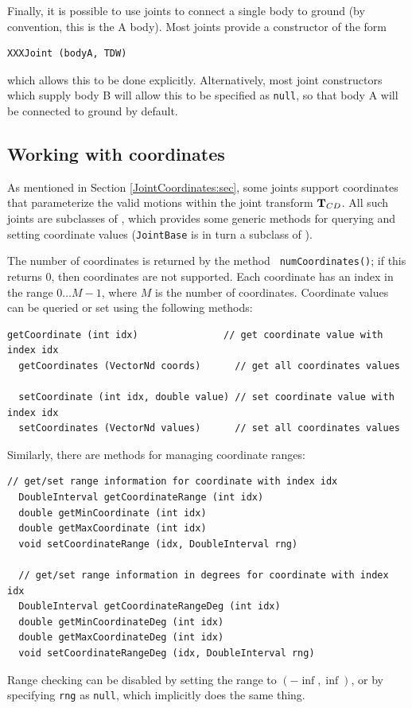 Finally, it is possible to use joints to connect a single body to
ground (by convention, this is the A body). Most joints provide a
constructor of the form
%
\begin{lstlisting}[]
  XXXJoint (bodyA, TDW)
\end{lstlisting}
%
which allows this to be done explicitly. Alternatively, most joint
constructors which supply body B will allow this to be specified as
{\tt null}, so that body A will be connected to ground by default.

\subsection{Working with coordinates}
\label{workingWithCoordinates:sec}

As mentioned in Section \ref{JointCoordinates:sec}, some joints
support coordinates that parameterize the valid motions within the
joint transform ${\bf T}_{CD}$. All such joints are subclasses of
,
which provides some generic methods for querying and setting
coordinate values ({\tt JointBase} is in turn a subclass of
).

The number of coordinates is returned by the method {\tt
numCoordinates()}; if this returns 0, then coordinates are not
supported. Each coordinate has an index in the range $0 \ldots M-1$,
where $M$ is the number of coordinates. Coordinate values can be
queried or set using the following methods:
%
\begin{lstlisting}[]
  getCoordinate (int idx)               // get coordinate value with index idx
  getCoordinates (VectorNd coords)      // get all coordinates values

  setCoordinate (int idx, double value) // set coordinate value with index idx
  setCoordinates (VectorNd values)      // set all coordinates values
\end{lstlisting}
%
Similarly, there are methods for managing coordinate ranges:
%
\begin{lstlisting}[]
  // get/set range information for coordinate with index idx
  DoubleInterval getCoordinateRange (int idx)	
  double getMinCoordinate (int idx)
  double getMaxCoordinate (int idx)
  void setCoordinateRange (idx, DoubleInterval rng)

  // get/set range information in degrees for coordinate with index idx
  DoubleInterval getCoordinateRangeDeg (int idx)
  double getMinCoordinateDeg (int idx)
  double getMaxCoordinateDeg (int idx)
  void setCoordinateRangeDeg (idx, DoubleInterval rng)
\end{lstlisting}
%
Range checking can be disabled by setting the range to
$(-\inf, \inf)$, or by specifying {\tt rng} as {\tt null}, which
implicitly does the same thing.

